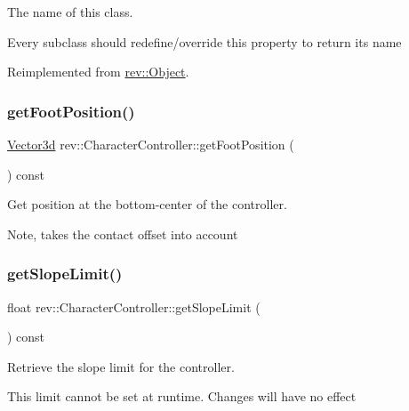 The name of this class. 

Every subclass should redefine/override this property to return its name 

Reimplemented from \mbox{\hyperlink{classrev_1_1_object_a7a2013f91169479b65cf93afdc5d9a68}{rev\+::\+Object}}.

\mbox{\label{classrev_1_1_character_controller_af8f6c4f320f1808326dc4b13b6c056d5}} 
\subsubsection{\texorpdfstring{getFootPosition()}{getFootPosition()}}
{\footnotesize\ttfamily \mbox{\hyperlink{classrev_1_1_vector}{Vector3d}} rev\+::\+Character\+Controller\+::get\+Foot\+Position (\begin{DoxyParamCaption}{ }\end{DoxyParamCaption}) const\hspace{0.3cm}{\ttfamily [inline]}}



Get position at the bottom-\/center of the controller. 

Note, takes the contact offset into account \mbox{\label{classrev_1_1_character_controller_a6ea84a3fbd399d2e57a8c37b45971cba}} 
\subsubsection{\texorpdfstring{getSlopeLimit()}{getSlopeLimit()}}
{\footnotesize\ttfamily float rev\+::\+Character\+Controller\+::get\+Slope\+Limit (\begin{DoxyParamCaption}{ }\end{DoxyParamCaption}) const\hspace{0.3cm}{\ttfamily [inline]}}



Retrieve the slope limit for the controller. 

This limit cannot be set at runtime. Changes will have no effect \mbox{\label{classrev_1_1_character_controller_ada6bfbcc3bb49626a720a09aed9a3fe8}} 
